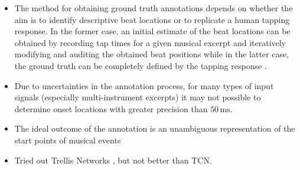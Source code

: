 \documentclass{scrartcl}
\begin{document}
\begin{itemize}
\item The method for obtaining ground truth annotations depends on whether the aim is to identify descriptive beat locations or to replicate a human tapping response. In the former case, an initial estimate of the beat locations can be obtained by recording tap times for a given musical excerpt and iteratively modifying and auditing the obtained beat positions while in the latter case, the ground truth can be completely defined by the tapping response \cite{Davies2009b}.
\item Due to uncertainties in the annotation process, for many types of input signals (especially multi-instrument excerpts) it may not possible to determine onset locations with greater precision than $50\,\text{ms}$. \cite{Leveau2004}
\item  The ideal outcome of the annotation is an unambiguous representation of the start points of musical events
\item Tried out Trellis Networks \cite{Bai2018b}, but not better than TCN. 
\end{itemize}


\newpage 


\end{document}
